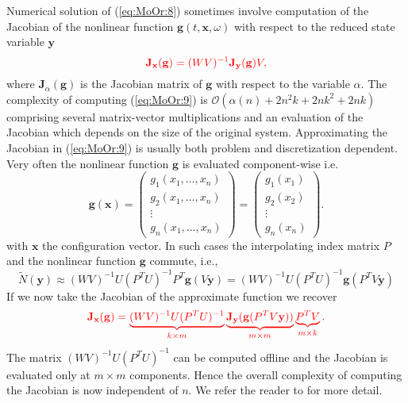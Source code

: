 {\edit Numerical solution of (\ref{eq:MoOr:8}) sometimes involve computation of the Jacobian of the nonlinear function $\mathbf g(t,\mathbf x, \omega)$ with respect to the reduced state variable $\mathbf y$}
\begin{equation} \label{eq:MoOr:9}
	\edit \mathbf J_{\mathbf x}(\mathbf g) = (WV)^{-1} \mathbf J_{\mathbf y}(\mathbf g) V,
\end{equation}
{\edit where $\mathbf J_\alpha(\mathbf g)$ is the Jacobian matrix of $\mathbf g$ with respect to the variable $\alpha$.} The complexity of computing (\ref{eq:MoOr:9}) is $\mathcal{O}(\alpha(n) +2n^2k+2nk^2+2nk)$ comprising several matrix-vector multiplications and an evaluation of the Jacobian which depends on the size of the original system. Approximating the Jacobian in (\ref{eq:MoOr:9}) is usually both problem and discretization dependent. Very often the nonlinear function $\mathbf g$ is evaluated component-wise i.e.
\begin{equation} \label{eq:MoOr:15}
	\mathbf g(\mathbf x) =
	\begin{pmatrix}
		g_1(x_1,\dots,x_n) \\
		g_2(x_1,\dots,x_n) \\
		\vdots \\
		g_n(x_1,\dots,x_n)
	\end{pmatrix}
	=
	\begin{pmatrix}
		g_1(x_1) \\
		g_2(x_2) \\
		\vdots \\
		g_n(x_n)
	\end{pmatrix}.
\end{equation}
with $\mathbf x$ the configuration vector. In such cases the interpolating index matrix $P$ and the nonlinear function $\mathbf g$ commute, i.e.,
\begin{equation} \label{eq:MoOr:16}
	\tilde N(\mathbf y) \approx (WV)^{-1} U(P^TU)^{-1}P^T \mathbf g(V\mathbf y) = (WV)^{-1} U(P^TU)^{-1}\mathbf g(P^TV\mathbf y)
\end{equation}
If we now take the Jacobian of the approximate function we recover
\begin{equation}
	\color{red} \mathbf J_{\mathbf x}(\mathbf g) = \underbrace{ (WV)^{-1} U(P^TU)^{-1} }_{k\times m} \underbrace{ \mathbf J_{\mathbf y}(\mathbf g(P^T V \mathbf y) ) }_{m\times m} \underbrace{P^T V}_{m\times k}.
\end{equation}
The matrix $(WV)^{-1} U(P^TU)^{-1}$ can be computed offline and the Jacobian is evaluated only at $m\times m$ components. Hence the overall complexity of computing the Jacobian is now independent of $n$. {\edit We refer the reader to \cite{Barrault:2004kz,Chaturantabut:2010cz} for more detail.}
